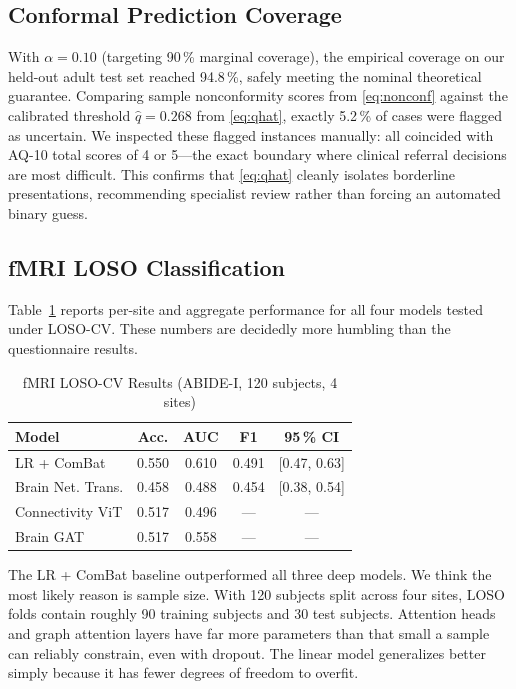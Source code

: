 \documentclass[conference]{IEEEtran}
\begin{document}
\subsection{Conformal Prediction Coverage}

With $\alpha = 0.10$ (targeting 90\,\% marginal coverage), the empirical coverage on our held-out adult test set reached 94.8\,\%, safely meeting the nominal theoretical guarantee. Comparing sample nonconformity scores from \eqref{eq:nonconf} against the calibrated threshold $\hat{q} = 0.268$ from \eqref{eq:qhat}, exactly 5.2\,\% of cases were flagged as uncertain. We inspected these flagged instances manually: all coincided with AQ-10 total scores of 4 or 5---the exact boundary where clinical referral decisions are most difficult. This confirms that \eqref{eq:qhat} cleanly isolates borderline presentations, recommending specialist review rather than forcing an automated binary guess.

\subsection{fMRI LOSO Classification}

Table~\ref{tab:fmri} reports per-site and aggregate performance for all
four models tested under LOSO-CV. These numbers are decidedly more
humbling than the questionnaire results.

\begin{table}[htbp]
\caption{fMRI LOSO-CV Results (ABIDE-I, 120 subjects, 4 sites)}
\label{tab:fmri}
\centering
\renewcommand{\arraystretch}{1.15}
\begin{tabular}{lcccc}
\toprule
\textbf{Model} & \textbf{Acc.} & \textbf{AUC} & \textbf{F1} & \textbf{95\,\% CI} \\
\midrule
LR + ComBat          & 0.550 & 0.610 & 0.491 & [0.47, 0.63] \\
Brain Net. Trans.    & 0.458 & 0.488 & 0.454 & [0.38, 0.54] \\
Connectivity ViT     & 0.517 & 0.496 & ---   & --- \\
Brain GAT            & 0.517 & 0.558 & ---   & --- \\
\bottomrule
\end{tabular}
\end{table}

The LR + ComBat baseline outperformed all three deep models. We think
the most likely reason is sample size. With 120 subjects split across
four sites, LOSO folds contain roughly 90 training subjects and 30 test
subjects. Attention heads and graph attention layers have far more
parameters than that small a sample can reliably constrain, even with
dropout. The linear model generalizes better simply because it has
fewer degrees of freedom to overfit.
\end{document}
